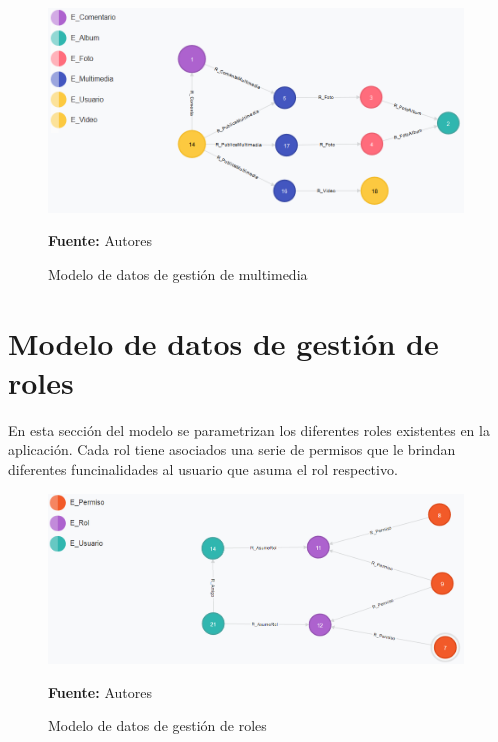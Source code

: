 \begin{figure}[!htb]
  \begin{center}
    \includegraphics[width=11cm]{./imagenes/Modelo_de_datos/Multimedia.png}
    \caption{Modelo de datos de gestión de multimedia}
    \label{fig:modelo_datos_gestion_multimedia}
    \textbf{Fuente:}  Autores \\
  \end{center}
\end{figure}

\section{Modelo de datos de gestión de roles}

En esta sección del modelo se parametrizan los diferentes roles existentes en la aplicación. Cada rol tiene asociados una serie de permisos que le brindan diferentes funcinalidades al usuario que asuma el rol respectivo.

\begin{figure}[!htb]
  \begin{center}
    \includegraphics[width=11cm]{./imagenes/Modelo_de_datos/Roles.png}
    \caption{Modelo de datos de gestión de roles}
    \label{fig:modelo_datos_gestion_roles}
    \textbf{Fuente:}  Autores \\
  \end{center}
\end{figure}